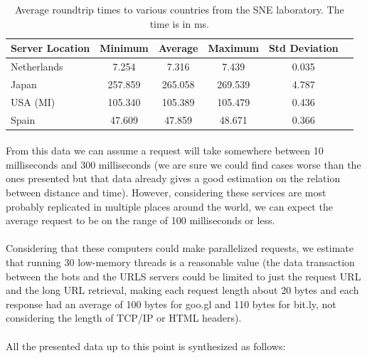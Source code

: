 \documentclass[12pt]{article}
\begin{document}
\begin{table}[h]
		\begin{tabular}{|l|c|c|c|c|c|}
  			\hline
	  		\textbf{Server Location} & \textbf{Minimum} & \textbf{Average} & \textbf{Maximum} & \textbf{Std Deviation} \\
	  		\hline
  			Netherlands & 7.254 & 7.316 & 7.439 & 0.035 \\ 
  			\hline
  			Japan & 257.859 & 265.058 & 269.539 & 4.787 \\
	  		\hline
  			USA (MI) & 105.340 & 105.389 & 105.479 & 0.436 \\
  			\hline
  			Spain & 47.609 & 47.859 & 48.671 & 0.366 \\
  			\hline
		\end{tabular}
	\caption[A table]{Average roundtrip times to various countries from the SNE laboratory. The time is in ms.}
\end{table}

\paragraph{}
From this data we can assume a request will take somewhere between 10 milliseconds and 300 milliseconds (we are sure we could find cases worse than the ones presented but that data already gives a good estimation on the relation between distance and time). However, considering these services are most probably replicated in multiple places around the world, we can expect the average request to be on the range of 100 milliseconds or less.

\paragraph{}
Considering that these computers could make parallelized requests, we estimate that running 30 low-memory threads is a reasonable value (the data transaction between the bots and the URLS servers could be limited to just the request URL and the long URL retrieval, making each request length about 20 bytes and each response had an average of 100 bytes for goo.gl and 110 bytes for bit.ly, not considering the length of TCP/IP or HTML headers).

\paragraph{}
All the presented data up to this point is synthesized as follows:
\end{document}
